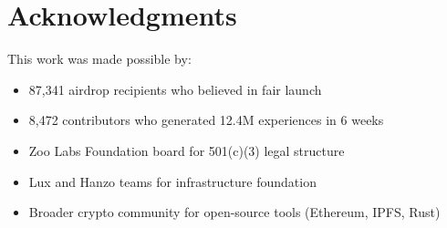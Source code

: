 \section*{Acknowledgments}


This work was made possible by:
\begin{itemize}
\item 87,341 airdrop recipients who believed in fair launch
\item 8,472 contributors who generated 12.4M experiences in 6 weeks
\item Zoo Labs Foundation board for 501(c)(3) legal structure
\item Lux and Hanzo teams for infrastructure foundation
\item Broader crypto community for open-source tools (Ethereum, IPFS, Rust)
\end{itemize}

